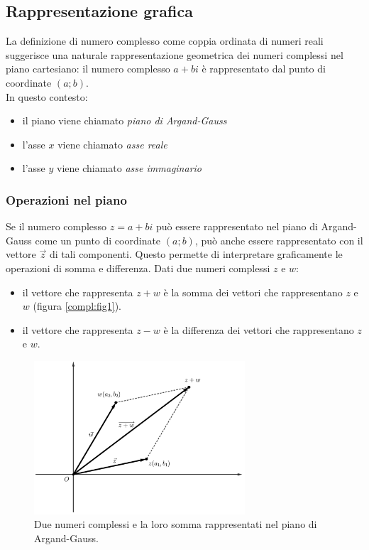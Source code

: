 \subsection{Rappresentazione grafica}
La definizione di numero complesso come coppia ordinata di numeri reali suggerisce una naturale rappresentazione geometrica dei numeri complessi nel piano cartesiano: il numero complesso $a+bi$ è rappresentato dal punto di coordinate $(a;b)$.\\
In questo contesto:
\begin{itemize}
	\item il piano viene chiamato \emph{piano di Argand-Gauss}
	\item l'asse $x$ viene chiamato \emph{asse reale}
	\item l'asse $y$ viene chiamato \emph{asse immaginario}
\end{itemize}

\subsubsection{Operazioni nel piano}
Se il numero complesso $z=a+bi$ può essere rappresentato nel piano di Argand-Gauss come un punto di coordinate $(a;b)$, può anche essere rappresentato con il vettore $\vec z$ di tali componenti. Questo permette di interpretare graficamente le operazioni di somma e differenza. Dati due numeri complessi $z$ e $w$:
\begin{itemize}
	\item il vettore che rappresenta $z+w$ è la somma dei vettori che rappresentano $z$ e $w$ (figura \vref{compl:fig1}).
	\item il vettore che rappresenta $z-w$ è la differenza dei vettori che rappresentano $z$ e $w$.
\end{itemize}

\begin{figure}[ht]
	\centering
	\includegraphics[width=0.7\textwidth]{grafici/complessi1}
	\caption{Due numeri complessi e la loro somma rappresentati nel piano di Argand-Gauss.}
	\label{compl:fig1}
\end{figure}


